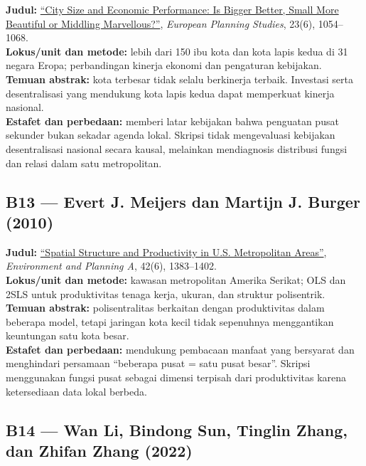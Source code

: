 \documentclass[
  indonesian,
  11pt,
  a4paper,
  oneside,
  openany]{report}
\begin{document}
\textbf{Judul:}
\href{https://doi.org/10.1080/09654313.2014.904998}{``City Size and
Economic Performance: Is Bigger Better, Small More Beautiful or Middling
Marvellous?''}, \emph{European Planning Studies}, 23(6), 1054--1068.\\
\textbf{Lokus/unit dan metode:} lebih dari 150 ibu kota dan kota lapis
kedua di 31 negara Eropa; perbandingan kinerja ekonomi dan pengaturan
kebijakan.\\
\textbf{Temuan abstrak:} kota terbesar tidak selalu berkinerja terbaik.
Investasi serta desentralisasi yang mendukung kota lapis kedua dapat
memperkuat kinerja nasional.\\
\textbf{Estafet dan perbedaan:} memberi latar kebijakan bahwa penguatan
pusat sekunder bukan sekadar agenda lokal. Skripsi tidak mengevaluasi
kebijakan desentralisasi nasional secara kausal, melainkan mendiagnosis
distribusi fungsi dan relasi dalam satu metropolitan.

\subsection{B13 --- Evert J. Meijers dan Martijn J. Burger
(2010)}\label{b13-evert-j.-meijers-dan-martijn-j.-burger-2010}

\textbf{Judul:} \href{https://doi.org/10.1068/a42151}{``Spatial
Structure and Productivity in U.S. Metropolitan Areas''},
\emph{Environment and Planning A}, 42(6), 1383--1402.\\
\textbf{Lokus/unit dan metode:} kawasan metropolitan Amerika Serikat;
OLS dan 2SLS untuk produktivitas tenaga kerja, ukuran, dan struktur
polisentrik.\\
\textbf{Temuan abstrak:} polisentralitas berkaitan dengan produktivitas
dalam beberapa model, tetapi jaringan kota kecil tidak sepenuhnya
menggantikan keuntungan satu kota besar.\\
\textbf{Estafet dan perbedaan:} mendukung pembacaan manfaat yang
bersyarat dan menghindari persamaan ``beberapa pusat = satu pusat
besar''. Skripsi menggunakan fungsi pusat sebagai dimensi terpisah dari
produktivitas karena ketersediaan data lokal berbeda.

\subsection{B14 --- Wan Li, Bindong Sun, Tinglin Zhang, dan Zhifan Zhang
(2022)}\label{b14-wan-li-bindong-sun-tinglin-zhang-dan-zhifan-zhang-2022}
\end{document}
